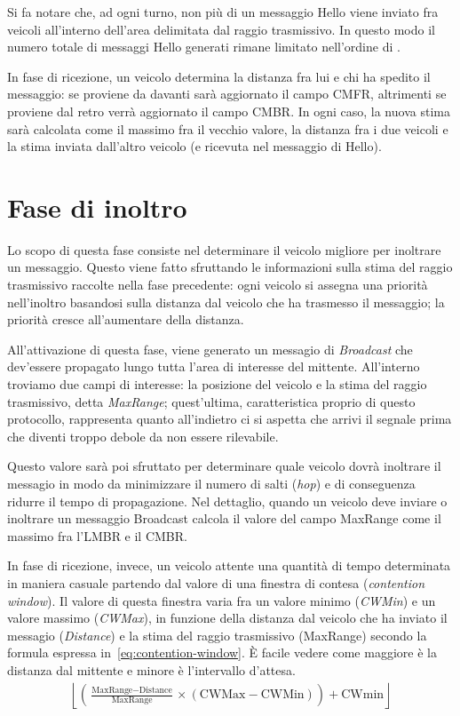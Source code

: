 Si fa notare che, ad ogni turno, non più di un messaggio Hello viene inviato fra veicoli all'interno dell'area delimitata dal raggio trasmissivo.
In questo modo il numero totale di messaggi Hello generati rimane limitato nell'ordine di .

In fase di ricezione, un veicolo determina la distanza fra lui e chi ha spedito il messaggio: se proviene da davanti sarà aggiornato il campo CMFR,
altrimenti se proviene dal retro verrà aggiornato il campo CMBR.
In ogni caso, la nuova stima sarà calcolata come il massimo fra il vecchio valore, la distanza fra i due veicoli e la stima inviata dall'altro veicolo
(e ricevuta nel messaggio di Hello).
%
\section{Fase di inoltro}
Lo scopo di questa fase consiste nel determinare il veicolo migliore per inoltrare un messaggio.
Questo viene fatto sfruttando le informazioni sulla stima del raggio trasmissivo raccolte nella fase precedente:
ogni veicolo si assegna una priorità nell'inoltro basandosi sulla distanza dal veicolo che ha trasmesso il messaggio;
la priorità cresce all'aumentare della distanza.

All'attivazione di questa fase, viene generato un messagio di \textit{Broadcast} che dev'essere propagato lungo tutta l'area di interesse del mittente.
All'interno troviamo due campi di interesse: la posizione del veicolo e la stima del raggio trasmissivo, detta \textit{MaxRange}; quest'ultima, caratteristica proprio di questo protocollo,
rappresenta quanto all'indietro ci si aspetta che arrivi il segnale prima che diventi troppo debole da non essere rilevabile.

Questo valore sarà poi sfruttato per determinare quale veicolo dovrà inoltrare il messagio in modo da minimizzare il numero di salti (\textit{hop}) e di conseguenza
ridurre il tempo di propagazione.
Nel dettaglio, quando un veicolo deve inviare o inoltrare un messaggio Broadcast calcola il valore del campo MaxRange come il massimo fra l'LMBR e il CMBR.

In fase di ricezione, invece, un veicolo attente una quantità di tempo determinata in maniera casuale partendo dal valore di una finestra di contesa (\textit{contention window}).
Il valore di questa finestra varia fra un valore minimo (\textit{CWMin}) e un valore massimo (\textit{CWMax}), in funzione della distanza dal veicolo che ha inviato il messagio (\textit{Distance})
e la stima del raggio trasmissivo (MaxRange) secondo la formula espressa in~\ref{eq:contention-window}.
È facile vedere come maggiore è la distanza dal mittente e minore è l'intervallo d'attesa.
\begin{gather}\label{eq:contention-window}
	\left\lfloor \left( \frac{\text{MaxRange} - \text{Distance}}{\text{MaxRange}} \times (\text{CWMax} - \text{CWMin}) \right) + \text{CWmin}  \right\rfloor
\end{gather}

